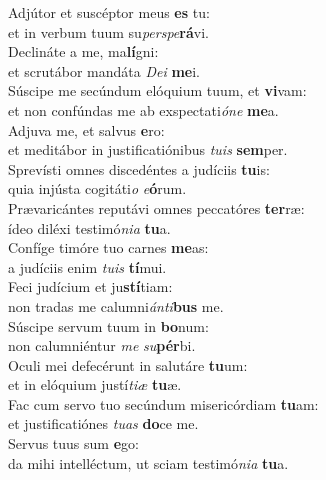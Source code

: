 \evenverse Adjútor et suscéptor meus \textbf{es} tu:~\*\\
\evenverse et in verbum tuum su\textit{per}\textit{spe}\textbf{rá}vi.\\
\oddverse Declináte a me, ma\textbf{lí}gni:~\*\\
\oddverse et scrutábor mandáta \textit{De}\textit{i} \textbf{me}i.\\
\evenverse Súscipe me secúndum elóquium tuum, et \textbf{vi}vam:~\*\\
\evenverse et non confúndas me ab exspectati\textit{ó}\textit{ne} \textbf{me}a.\\
\oddverse Adjuva me, et salvus \textbf{e}ro:~\*\\
\oddverse et meditábor in justificatiónibus \textit{tu}\textit{is} \textbf{sem}per.\\
\evenverse Sprevísti omnes discedéntes a judíciis \textbf{tu}is:~\*\\
\evenverse quia injústa cogitáti\textit{o} \textit{e}\textbf{ó}rum.\\
\oddverse Prævaricántes reputávi omnes peccatóres \textbf{ter}ræ:~\*\\
\oddverse ídeo diléxi testimó\textit{ni}\textit{a} \textbf{tu}a.\\
\evenverse Confíge timóre tuo carnes \textbf{me}as:~\*\\
\evenverse a judíciis enim \textit{tu}\textit{is} \textbf{tí}mui.\\
\oddverse Feci judícium et ju\textbf{stí}tiam:~\*\\
\oddverse non tradas me calumni\textit{án}\textit{ti}\textbf{bus} me.\\
\evenverse Súscipe servum tuum in \textbf{bo}num:~\*\\
\evenverse non calumniéntur \textit{me} \textit{su}\textbf{pér}bi.\\
\oddverse Oculi mei defecérunt in salutáre \textbf{tu}um:~\*\\
\oddverse et in elóquium justí\textit{ti}\textit{æ} \textbf{tu}æ.\\
\evenverse Fac cum servo tuo secúndum misericórdiam \textbf{tu}am:~\*\\
\evenverse et justificatiónes \textit{tu}\textit{as} \textbf{do}ce me.\\
\oddverse Servus tuus sum \textbf{e}go:~\*\\
\oddverse da mihi intelléctum, ut sciam testimó\textit{ni}\textit{a} \textbf{tu}a.\\
